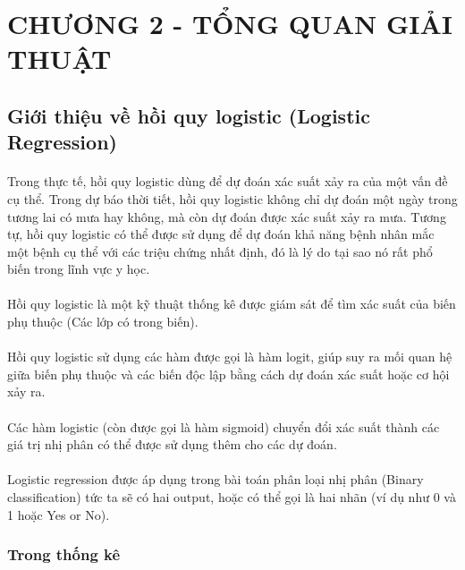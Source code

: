\documentclass{article}
\begin{document}
\section*{CHƯƠNG 2 - TỔNG QUAN GIẢI THUẬT}
\setcounter{section}{2}
\setcounter{subsection}{0}

\subsection{Giới thiệu về hồi quy logistic (Logistic Regression)}
\paragraph{}
 Trong thực tế, hồi quy logistic dùng để dự đoán xác suất xảy ra của một vấn đề cụ thể. Trong dự báo thời tiết, hồi quy logistic không chỉ dự đoán một ngày trong tương lai có mưa hay không, mà còn dự đoán được xác suất xảy ra mưa. Tương tự, hồi quy logistic có thể được sử dụng để dự đoán khả năng bệnh nhân mắc một bệnh cụ thể với các triệu chứng nhất định, đó là lý do tại sao nó rất phổ biến trong lĩnh vực y học.
\paragraph{}
Hồi quy logistic là một kỹ thuật thống kê được giám sát để tìm xác suất của biến phụ thuộc (Các lớp có trong biến).
\paragraph{}
Hồi quy logistic sử dụng các hàm được gọi là hàm logit, giúp suy ra mối quan hệ giữa biến phụ thuộc và các biến độc lập bằng cách dự đoán xác suất hoặc cơ hội xảy ra.
\paragraph{}
Các hàm logistic (còn được gọi là hàm sigmoid) chuyển đổi xác suất thành các giá trị nhị phân có thể được sử dụng thêm cho các dự đoán.
 \paragraph{}
 Logistic regression được áp dụng trong bài toán phân loại nhị phân (Binary classification) tức ta sẽ có hai output, hoặc có thể gọi là hai nhãn (ví dụ như 0 và 1 hoặc Yes or No).
	
\subsubsection{Trong thống kê}
\end{document}
